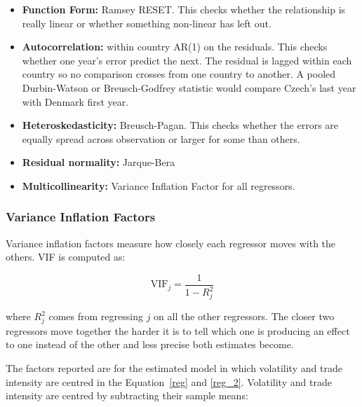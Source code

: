 \begin{itemize}
    \vspace{\baselineskip}
    \item \textbf{Function Form:} Ramsey RESET. 
    This checks whether the relationship is really linear or whether something non-linear has left out.
    \vspace{\baselineskip}
    \item\textbf{Autocorrelation:} within country AR(1) on the residuals. 
    This checks whether one year's error predict the next.
    The residual is lagged within each country so no comparison crosses from one country to another.
    A pooled Durbin-Watson or Breusch-Godfrey statistic would compare Czech's last year with Denmark first year.
    \vspace{\baselineskip}
    \item\textbf{Heteroskedasticity:} Breusch-Pagan. 
    This checks whether the errors are equally spread across observation or larger for some than others.
    \vspace{\baselineskip}
    \item\textbf{Residual normality:} Jarque-Bera
    \vspace{\baselineskip}
    \item\textbf{Multicollinearity:} Variance Inflation Factor for all regressors.
\end{itemize}

\subsubsection{Variance Inflation Factors}

Variance inflation factors measure how closely each regressor moves with the others.
VIF is computed as:

\begin{equation}\label{meth_vif}
    \text{VIF}_j = \frac{1}{1- R_j^2}
\end{equation}

\vspace{\baselineskip}

where $R_j^2$ comes from regressing $j$ on all the other regressors. 
The closer two regressors move together the harder it is to tell which one is producing an effect to one instead of the other and less precise both estimates become.

\vspace{\baselineskip}

The factors reported are for the estimated model in which volatility and trade intensity are centred in the Equation~\ref{reg} and \ref{reg_2}.
Volatility and trade intensity are centred by subtracting their sample means:

